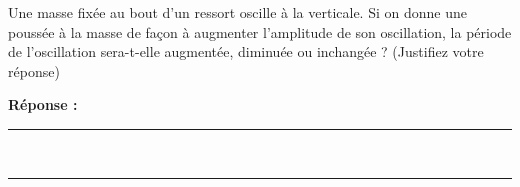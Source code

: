 Une masse fixée au bout d’un ressort oscille à la verticale. Si on donne une poussée à la masse de façon à augmenter l’amplitude de son oscillation, la période de l’oscillation sera-t-elle augmentée, diminuée ou inchangée ? (Justifiez votre réponse)

\noindent\textbf{Réponse :} \hrulefill \\[2.5ex]
\rule{\linewidth}{0.4pt} \\[2.5ex]
\rule{\linewidth}{0.4pt}
\vfill
